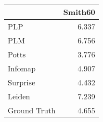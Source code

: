 \begin{tabular}{lr}
\toprule
{} & Smith60 \\
\midrule
PLP          &   6.337 \\
PLM          &   6.756 \\
Potts        &   3.776 \\
Infomap      &   4.907 \\
Surprise     &   4.432 \\
Leiden       &   7.239 \\
Ground Truth &   4.655 \\
\bottomrule
\end{tabular}
